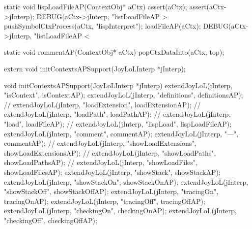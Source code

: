 static void lispLoadFileAP(ContextObj* aCtx) {
  assert(aCtx);
  assert(aCtx->jInterp);
  DEBUG(aCtx->jInterp, "listLoadFileAP > %
  pushSymbolCtxProcess(aCtx, "lispInterpret");
  loadFileAP(aCtx);
  DEBUG(aCtx->jInterp, "listLoadFileAP < %
}
\stoptyping

\startCCode
static void commentAP(ContextObj* aCtx) {
  popCtxDataInto(aCtx, top);
}
\stopCCode

\startCHeader
extern void initContextsAPSupport(JoyLoLInterp *jInterp);
\stopCHeader
{}

\startCCode
void initContextsAPSupport(JoyLoLInterp *jInterp) {
  extendJoyLoL(jInterp, "isContext",           isContextAP);
  extendJoyLoL(jInterp, "definitions",         definitionsAP);
//  extendJoyLoL(jInterp, "loadExtension",       loadExtensionAP);
//  extendJoyLoL(jInterp, "loadPath",            loadPathAP);
//  extendJoyLoL(jInterp, "load",                loadFileAP);
//  extendJoyLoL(jInterp, "lispLoad",            lispLoadFileAP);
  extendJoyLoL(jInterp, "comment",             commentAP);
  extendJoyLoL(jInterp, "---",                 commentAP);
//  extendJoyLoL(jInterp, "showLoadExtensions",  showLoadExtensionsAP);
//  extendJoyLoL(jInterp, "showLoadPaths",       showLoadPathsAP);
//  extendJoyLoL(jInterp, "showLoadFiles",       showLoadFilesAP);
  extendJoyLoL(jInterp, "showStack",           showStackAP);
  extendJoyLoL(jInterp, "showStackOn",         showStackOnAP);
  extendJoyLoL(jInterp, "showStackOff",        showStackOffAP);
  extendJoyLoL(jInterp, "tracingOn",           tracingOnAP);
  extendJoyLoL(jInterp, "tracingOff",          tracingOffAP);
  extendJoyLoL(jInterp, "checkingOn",          checkingOnAP);
  extendJoyLoL(jInterp, "checkingOff",         checkingOffAP);
}
\stopCCode